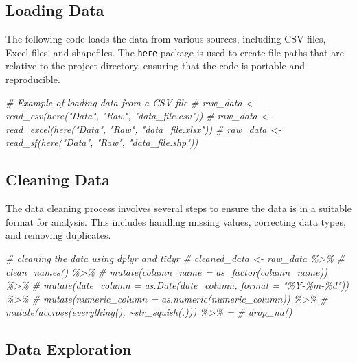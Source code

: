 \documentclass[
  12pt,
]{article}
\newenvironment{Shaded}{\begin{snugshade}}{\end{snugshade}}
\newcommand{\CommentTok}[1]{\textcolor[rgb]{0.56,0.35,0.01}{\textit{#1}}}
\begin{document}
\subsection{Loading Data}\label{loading-data}

The following code loads the data from various sources, including CSV
files, Excel files, and shapefiles. The \texttt{here} package is used to
create file paths that are relative to the project directory, ensuring
that the code is portable and reproducible.

\begin{Shaded}
\begin{Highlighting}[]
\CommentTok{\# Example of loading data from a CSV file}
\CommentTok{\# raw\_data \textless{}{-} read\_csv(here("Data", "Raw", "data\_file.csv"))}
\CommentTok{\# raw\_data \textless{}{-} read\_excel(here("Data", "Raw", "data\_file.xlsx"))}
\CommentTok{\# raw\_data \textless{}{-} read\_sf(here("Data", "Raw", "data\_file.shp"))}
\end{Highlighting}
\end{Shaded}

\subsection{Cleaning Data}\label{cleaning-data}

The data cleaning process involves several steps to ensure the data is
in a suitable format for analysis. This includes handling missing
values, correcting data types, and removing duplicates.

\begin{Shaded}
\begin{Highlighting}[]
\CommentTok{\# cleaning the data using dplyr and tidyr}
\CommentTok{\# cleaned\_data \textless{}{-} raw\_data \%\textgreater{}\%}
\CommentTok{\#   clean\_names() \%\textgreater{}\%}
\CommentTok{\#   mutate(column\_name = as\_factor(column\_name)) \%\textgreater{}\% }
\CommentTok{\#   mutate(date\_column = as.Date(date\_column, format = "\%Y{-}\%m{-}\%d")) \%\textgreater{}\% }
\CommentTok{\#   mutate(numeric\_column = as.numeric(numeric\_column)) \%\textgreater{}\% }
\CommentTok{\#   mutate(accross(everything(), \textasciitilde{}str\_squish(.))) \%\textgreater{}\% =}
\CommentTok{\#   drop\_na()}
\end{Highlighting}
\end{Shaded}

\subsection{Data Exploration}\label{data-exploration}
\end{document}
